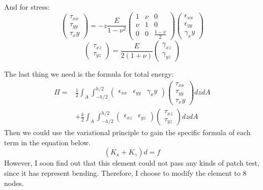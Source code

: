 \documentclass[UTF8]{ctexbook}
\begin{document}
     And for stress:
     \begin{equation}
     \left( \begin{array} {c}
        \tau_{xx} \\
        \tau_{yy} \\
        \tau_xy \end{array}\right) = -z \frac{E}{1-\nu^2}
     \left( \begin{array} {ccc}
        1 & \nu & 0 \\
        \nu & 1 & 0\\
        0 & 0 & \frac{1-\nu}{2} \end{array}\right)
     \left( \begin{array} {c}
        \epsilon_{xx} \\
        \epsilon_{yy} \\
        \gamma_xy \end{array}\right)
     \end{equation}
     \begin{equation}
     \left( \begin{array} {c}
        \tau_{xz} \\
        \tau_{yz} \end{array}\right) = \frac{E}{2(1+\nu)}
     \left( \begin{array} {c}
        \gamma_{xz} \\
        \gamma_{yz} \end{array}\right)
     \end{equation}
     
     The last thing we need is the formula for total energy:
     \begin{equation}
     \begin{split}
        \Pi = &\frac{1}{2}\int_A\int^{h/2}_{-h/2}
        \left( \begin{array} {ccc}
        \epsilon_{xx} & \epsilon_{yy} & \gamma_xy \end{array}\right)
             \left( \begin{array} {c}
        \tau_{xx} \\
        \tau_{yy} \\
        \tau_xy \end{array}\right)dzdA \\ &+ 
        \frac{k}{2}\int_A\int^{h/2}_{-h/2}
                \left( \begin{array} {cc}
        \epsilon_{xz} & \epsilon_{yz}\end{array}\right)
        \left( \begin{array} {c}
        \tau_{xz} \\
        \tau_{yz} \end{array}\right)dzdA
     \end{split}
     \end{equation}
     Then we could use the variational principle to gain the specific formula of each term in the equation below.
     \begin{equation}
        (K_\kappa + K_\gamma)d = f
     \end{equation}
     However, I soon find out that this element could not pass any kinds of patch test, since it has represent bending. Therefore, I choose to modify the element to 8 nodes.
\end{document}
